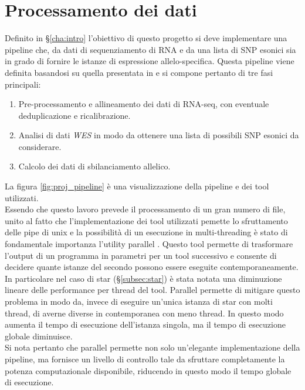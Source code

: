 \graphicspath{{chapters/03/media/}}
\chapter{Processamento dei dati}
\label{cha:processamento}
Definito in \S\ref{cha:intro} l'obiettivo di questo progetto si deve implementare una pipeline che, da dati di sequenziamento di RNA e da una lista di SNP esonici  sia in grado di fornire le istanze di espressione allelo-specifica.
Questa pipeline viene definita basandosi su quella presentata in \cite{ase_pipeline} e si compone pertanto di tre fasi principali:
\begin{enumerate}
	\item Pre-processamento e allineamento dei dati di RNA-seq, con eventuale deduplicazione e ricalibrazione.
	\item Analisi di dati \emph{WES} in modo da ottenere una lista di possibili SNP esonici da considerare.
	\item Calcolo dei dati di sbilanciamento allelico.
\end{enumerate}
La figura \ref{fig:proj_pipeline} \`e una visualizzazione della pipeline e dei tool utilizzati.\\
Essendo che questo lavoro prevede il processamento di un gran numero di file, unito al fatto che l'implementazione dei tool utilizzati pemette lo sfruttamento delle pipe di unix e la possibilit\`a di un esecuzione in multi-threading \`e stato di fondamentale importanza l'utility parallel \cite{parallel}.
Questo tool permette di trasformare l'output di un programma in parametri per un tool successivo e consente di decidere quante istanze del secondo possono essere eseguite contemporaneamente.\\
In particolare nel caso di star (\S\ref{subsec:star}) \`e stata notata una diminuzione lineare delle performance per thread del tool.
Parallel permette di mitigare questo problema in modo da, invece di eseguire un'unica istanza di star con molti thread, di averne diverse in contemporanea con meno thread.
In questo modo aumenta il tempo di esecuzione dell'istanza singola, ma il tempo di esecuzione globale diminuisce.\\
Si nota pertanto che parallel permette non solo un'elegante implementazione della pipeline, ma fornisce un livello di controllo tale da sfruttare completamente la potenza computazionale disponibile, riducendo in questo modo il tempo globale di esecuzione.

